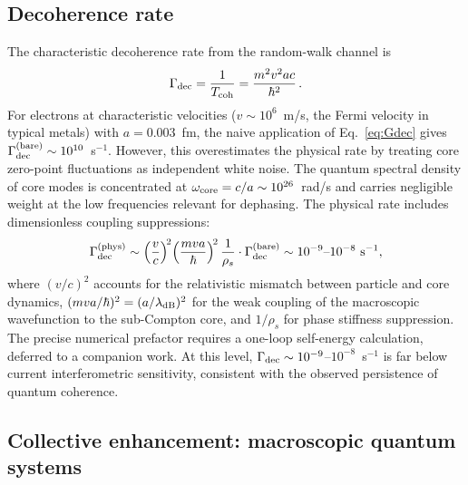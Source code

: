 ﻿\documentclass[a4paper,12pt]{article}
\begin{document}
\subsection{Decoherence rate}

The characteristic decoherence rate from the random-walk channel is
\begin{equation}
  \Gamma_{\rm dec} = \frac{1}{T_{\rm coh}}
    = \frac{m^2 v^2 ac}{\hbar^2}\,.
  \label{eq:Gdec}
\end{equation}
For electrons at characteristic velocities ($v\sim 10^6$~m/s,
the Fermi velocity in typical metals) with
$a=0.003$~fm, the naive application of Eq.~\eqref{eq:Gdec} gives
$\Gamma_{\rm dec}^{(\rm bare)}\sim 10^{10}$~s$^{-1}$.  However, this
overestimates the physical rate by treating core zero-point fluctuations
as independent white noise.  The quantum spectral density of core
modes is concentrated at $\omega_{\rm core}=c/a\sim 10^{26}$~rad/s
and carries negligible weight at the low frequencies relevant for
dephasing.  The physical rate includes dimensionless coupling
suppressions:
\begin{equation}
  \Gamma_{\rm dec}^{(\rm phys)} \sim
    \left(\frac{v}{c}\right)^{\!2}
    \!\left(\frac{mva}{\hbar}\right)^{\!2}
    \frac{1}{\rho_s}\cdot\Gamma_{\rm dec}^{(\rm bare)}
    \sim 10^{-9}\text{--}10^{-8}~\text{s}^{-1},
  \label{eq:Gdec_phys}
\end{equation}
where $(v/c)^2$ accounts for the relativistic mismatch between
particle and core dynamics, $(mva/\hbar)^2=(a/\lambda_{\rm dB})^2$
for the weak coupling of the macroscopic wavefunction to the
sub-Compton core, and $1/\rho_s$ for phase stiffness suppression.
The precise numerical prefactor requires a one-loop self-energy
calculation, deferred to a companion work.
At this level, $\Gamma_{\rm dec}\sim 10^{-9}$--$10^{-8}$~s$^{-1}$
is far below current interferometric sensitivity, consistent with the
observed persistence of quantum coherence.

\subsection{Collective enhancement: macroscopic quantum systems}
\label{sec:squid}
\end{document}
